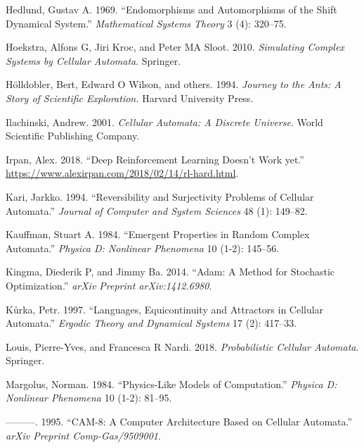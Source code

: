 \documentclass[
  openany]{book}
\newlength{\cslhangindent}
\newenvironment{cslreferences}%
  {\setlength{\parindent}{0pt}%
  \everypar{\setlength{\hangindent}{\cslhangindent}}\ignorespaces}%
  {\par}
\begin{document}
\begin{cslreferences}
\leavevmode\hypertarget{ref-hedlund1969endomorphisms}{}%
Hedlund, Gustav A. 1969. ``Endomorphisms and Automorphisms of the Shift Dynamical System.'' \emph{Mathematical Systems Theory} 3 (4): 320--75.

\leavevmode\hypertarget{ref-hoekstra2010simulating}{}%
Hoekstra, Alfons G, Jiri Kroc, and Peter MA Sloot. 2010. \emph{Simulating Complex Systems by Cellular Automata}. Springer.

\leavevmode\hypertarget{ref-holldobler1994journey}{}%
Hölldobler, Bert, Edward O Wilson, and others. 1994. \emph{Journey to the Ants: A Story of Scientific Exploration.} Harvard University Press.

\leavevmode\hypertarget{ref-ilachinski2001cellular}{}%
Ilachinski, Andrew. 2001. \emph{Cellular Automata: A Discrete Universe}. World Scientific Publishing Company.

\leavevmode\hypertarget{ref-rlblogpost}{}%
Irpan, Alex. 2018. ``Deep Reinforcement Learning Doesn't Work yet.'' \url{https://www.alexirpan.com/2018/02/14/rl-hard.html}.

\leavevmode\hypertarget{ref-kari1994reversibility}{}%
Kari, Jarkko. 1994. ``Reversibility and Surjectivity Problems of Cellular Automata.'' \emph{Journal of Computer and System Sciences} 48 (1): 149--82.

\leavevmode\hypertarget{ref-kauffman1984emergent}{}%
Kauffman, Stuart A. 1984. ``Emergent Properties in Random Complex Automata.'' \emph{Physica D: Nonlinear Phenomena} 10 (1-2): 145--56.

\leavevmode\hypertarget{ref-kingma2014adam}{}%
Kingma, Diederik P, and Jimmy Ba. 2014. ``Adam: A Method for Stochastic Optimization.'' \emph{arXiv Preprint arXiv:1412.6980}.

\leavevmode\hypertarget{ref-kuurka1997languages}{}%
Kůrka, Petr. 1997. ``Languages, Equicontinuity and Attractors in Cellular Automata.'' \emph{Ergodic Theory and Dynamical Systems} 17 (2): 417--33.

\leavevmode\hypertarget{ref-louis2018probabilistic}{}%
Louis, Pierre-Yves, and Francesca R Nardi. 2018. \emph{Probabilistic Cellular Automata}. Springer.

\leavevmode\hypertarget{ref-margolus1984physics}{}%
Margolus, Norman. 1984. ``Physics-Like Models of Computation.'' \emph{Physica D: Nonlinear Phenomena} 10 (1-2): 81--95.

\leavevmode\hypertarget{ref-margolus1995cam}{}%
---------. 1995. ``CAM-8: A Computer Architecture Based on Cellular Automata.'' \emph{arXiv Preprint Comp-Gas/9509001}.


\end{cslreferences}
\end{document}
